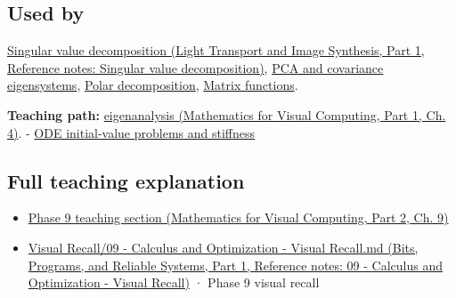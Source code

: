 \subsection{Used by}\label{appendix-0b3be18411f9-used-by}

\hypertarget{appendix-0b3be18411f9-used-by}{}

\href{../04-Light-Transport-and-Image-Synthesis-P01/main.pdf\#appendix-1fad5e7f36fa}{Singular value decomposition (Light Transport and Image Synthesis, Part 1, Reference notes: Singular value decomposition)}, \hyperref[appendix-ad175ef3c5bf]{PCA and covariance eigensystems}, \hyperref[appendix-73f5bcf7a462]{Polar decomposition}, \hyperref[appendix-0f4bc2bf2b1f]{Matrix functions}.

\textbf{Teaching path:} \href{../02-Mathematics-for-Visual-Computing-P01/main.pdf\#01-foundations-i-ch020-eigenvectors-reveal-the-directions-a-square-map-does-not-turn}{eigenanalysis (Mathematics for Visual Computing, Part 1, Ch. 4)}. - \hyperref[appendix-e8ab9836882e]{ODE initial-value problems and stiffness}

\subsection{Full teaching explanation}\label{appendix-0b3be18411f9-full-teaching-explanation}

\hypertarget{appendix-0b3be18411f9-full-teaching-explanation}{}

\begin{itemize}
\tightlist
\item
  \href{../02-Mathematics-for-Visual-Computing-P02/main.pdf\#02-foundations-ii-ch025-odes-and-numerical-simulation}{Phase 9 teaching section (Mathematics for Visual Computing, Part 2, Ch. 9)}
\item
  \href{../01-Bits-Programs-and-Reliable-Systems-P01/main.pdf\#appendix-adf48f5dc5c1}{Visual Recall/09 - Calculus and Optimization - Visual Recall.md (Bits, Programs, and Reliable Systems, Part 1, Reference notes: 09 - Calculus and Optimization - Visual Recall)} · Phase 9 visual recall
\end{itemize}
